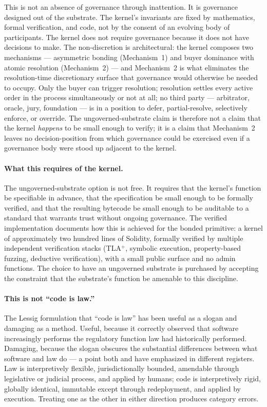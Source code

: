 \documentclass[11pt,a4paper]{article}
\theoremstyle{remark}
\begin{document}
This is not an absence of governance through inattention. It is
governance designed out of the substrate. The kernel's invariants
are fixed by mathematics, formal verification, and code, not by
the consent of an evolving body of participants. The kernel
does not require governance because it does not have decisions
to make. The non-discretion is architectural: the kernel composes
two mechanisms --- asymmetric bonding (Mechanism~1) and buyer
dominance with atomic resolution (Mechanism~2) --- and Mechanism~2
is what eliminates the resolution-time discretionary surface that
governance would otherwise be needed to occupy. Only the buyer can
trigger resolution; resolution settles every active order in the
process simultaneously or not at all; no third party --- arbitrator,
oracle, jury, foundation --- is in a position to defer, partial-resolve,
selectively enforce, or override. The ungoverned-substrate claim
is therefore not a claim that the kernel \emph{happens} to be
small enough to verify; it is a claim that Mechanism~2 leaves
no decision-position from which governance could be exercised
even if a governance body were stood up adjacent to the kernel.

\paragraph{What this requires of the kernel.}
The ungoverned-substrate option is not free. It requires that
the kernel's function be specifiable in advance, that the
specification be small enough to be formally verified, and that
the resulting bytecode be small enough to be auditable to a
standard that warrants trust without ongoing governance. The
verified implementation documents how this is achieved for the
bonded primitive: a kernel of approximately two hundred
lines of Solidity, formally verified by multiple independent
verification stacks (TLA$^+$, symbolic execution, property-based
fuzzing, deductive verification), with a small public surface
and no admin functions. The choice to have an ungoverned
substrate is purchased by accepting the constraint that the
substrate's function be amenable to this discipline.

\paragraph{This is not ``code is law.''}
The Lessig formulation \citep{lessig2006code} that ``code is
law'' has been useful as a slogan and damaging as a method.
Useful, because it correctly observed that software increasingly
performs the regulatory function law had historically performed.
Damaging, because the slogan obscures the substantial differences
between what software and law do --- a point both
\citet{walch2017path} and \citet{defilippi_wright_2018} have
emphasized in different registers. Law is interpretively
flexible, jurisdictionally bounded, amendable through legislative
or judicial process, and applied by humans; code is interpretively
rigid, globally identical, immutable except through redeployment,
and applied by execution. Treating one as the other in either
direction produces category errors.
\end{document}
